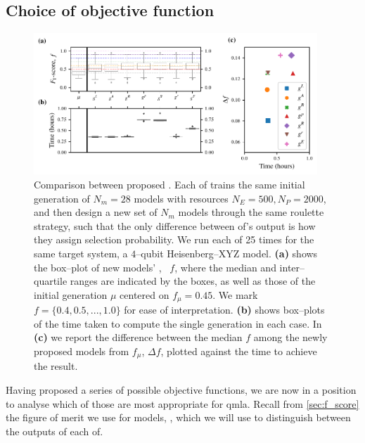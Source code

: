 \subsection{Choice of objective function}\label{sec:obj_fnc_selection}
\begin{figure}
    \centering
    \includegraphics[width=0.95\textwidth]{theoretical_study/figures/objective_fnc_comparison.pdf}
    \caption[Comparison between proposed ]{
        Comparison between proposed . 
        Each \gls{of} trains the same initial generation of $N_m=28$ models with resources
        $N_E=500, N_P=2000$, and then design a new set of $N_m$ models through 
        the same roulette strategy, such that the only difference between \gls{of}'s output 
        is how they assign selection probability.
        We run each \gls{of} 25 times for the same target system, 
            a $4$--qubit Heisenberg--XYZ model. 
        \textbf{(a)} shows the box--plot of new models' \fs, \ $f$, 
            where the median and inter--quartile ranges are indicated by the boxes,
            as well as those of the initial generation $\mu$ centered on $f_{\mu}=0.45$.
            We mark $f=\{0.4, 0.5, ..., 1.0\}$ for ease of interpretation. 
        \textbf{(b)} shows box--plots of the time taken to compute the single generation in each case.
        In \textbf{(c)} we report the difference between the median $f$ among the 
            newly proposed models from $f_{\mu}$, $\Delta f$,
            plotted against the time to achieve the result. 
    }
    \label{fig:obj_fnc_comparison}
\end{figure}

Having proposed a series of possible objective functions, 
    we are now in a position to analyse which of those are most appropriate for \gls{qmla}. 
Recall from \cref{sec:f_score} the figure of merit we use for models, \fs, 
    which we will use to distinguish between the outputs of each \gls{of}.
\par 


